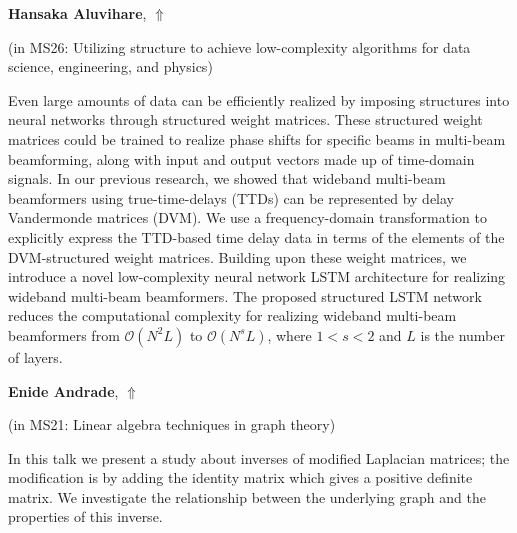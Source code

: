 \documentclass[ILAS2025-program.tex]{subfiles}
\begin{document}
\hypertarget{down0059}{}\begin{ilasabstract}
    
\textbf{Hansaka Aluvihare},  \hfill \hyperlink{up0059}{$\Uparrow$}
    
    
(in {\color{mstitle}MS26: Utilizing structure to achieve low-complexity algorithms for data science, engineering, and physics})
        
\mtskip
    Even large amounts of data can be efficiently realized by imposing structures into neural networks through structured weight matrices. These structured weight matrices could be trained to realize phase shifts for specific beams in multi-beam beamforming, along with input and output vectors made up of time-domain signals. In our previous research, we showed that wideband multi-beam beamformers using true-time-delays (TTDs) can be represented by delay Vandermonde matrices (DVM). We use a frequency-domain transformation to explicitly express the TTD-based time delay data in terms of the elements of the DVM-structured weight matrices. Building upon these weight matrices, we introduce a novel low-complexity neural network LSTM architecture for realizing wideband multi-beam beamformers. The proposed structured LSTM network reduces the computational complexity for realizing wideband multi-beam beamformers from $\mathcal{O}(N^2L)$ to $\mathcal{O}(N^sL)$, where $1 < s < 2$ and $L$ is the number of layers.

\end{ilasabstract}
    

\hypertarget{down0170}{}\begin{ilasabstract}
    
\textbf{Enide Andrade},  \hfill \hyperlink{up0170}{$\Uparrow$}
    
    
(in {\color{mstitle}MS21: Linear algebra techniques in graph theory})
        
\mtskip
    In this talk we present a study about inverses of modified Laplacian matrices; the modification is by adding the
identity matrix which gives a positive definite matrix. We investigate the relationship between
the underlying graph and the properties of this inverse. 
\end{ilasabstract}
    
\end{document}
